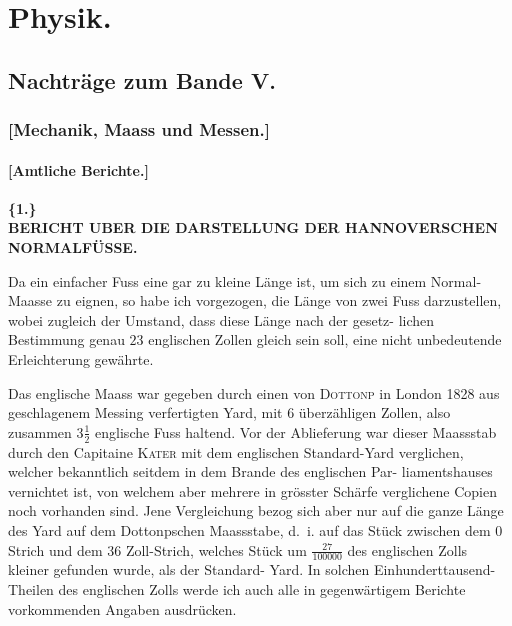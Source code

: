 \documentclass[12pt,a4paper]{article}
\theoremstyle{plain}
\theoremstyle{definition}
\theoremstyle{remark}
\begin{document}
\newpage
\setcounter{page}{4}

\section*{Physik.}

\subsection*{Nachtr\"age zum Bande V.}

\subsubsection*{[Mechanik, Maass und Messen.]}

\paragraph*{[Amtliche Berichte.]}


\vspace{0.5cm}

\noindent\textbf{\{1.\}}\\
\textbf{BERICHT UBER DIE DARSTELLUNG DER HANNOVERSCHEN NORMALF\"USSE.}

\vspace{0.3cm}

Da ein einfacher Fuss eine gar zu kleine L\"ange ist, um sich zu einem
Normal-Maasse zu eignen, so habe ich vorgezogen, die L\"ange von zwei Fuss
darzustellen, wobei zugleich der Umstand, dass diese L\"ange nach der gesetz-
lichen Bestimmung genau $23$ englischen Zollen gleich sein soll, eine nicht
unbedeutende Erleichterung gew\"ahrte.

Das englische Maass war gegeben durch einen von \textsc{Dottonp} in London
1828 aus geschlagenem Messing verfertigten Yard, mit 6 \"uberz\"ahligen Zollen,
also zusammen $3\frac{1}{2}$ englische Fuss haltend. Vor der Ablieferung war dieser
Maassstab durch den Capitaine \textsc{Kater} mit dem englischen Standard-Yard
verglichen, welcher bekanntlich seitdem in dem Brande des englischen Par-
liamentshauses vernichtet ist, von welchem aber mehrere in gr\"osster Sch\"arfe
verglichene Copien noch vorhanden sind. Jene Vergleichung bezog sich aber
nur auf die ganze L\"ange des Yard auf dem Dottonpschen Maassstabe, d.~i. auf
das St\"uck zwischen dem 0 Strich und dem 36 Zoll-Strich, welches St\"uck
um $\frac{27}{100000}$ des englischen Zolls kleiner gefunden wurde, als der Standard-
Yard. In solchen Einhunderttausend-Theilen des englischen Zolls werde ich
auch alle in gegenw\"artigem Berichte vorkommenden Angaben ausdr\"ucken.
\end{document}
